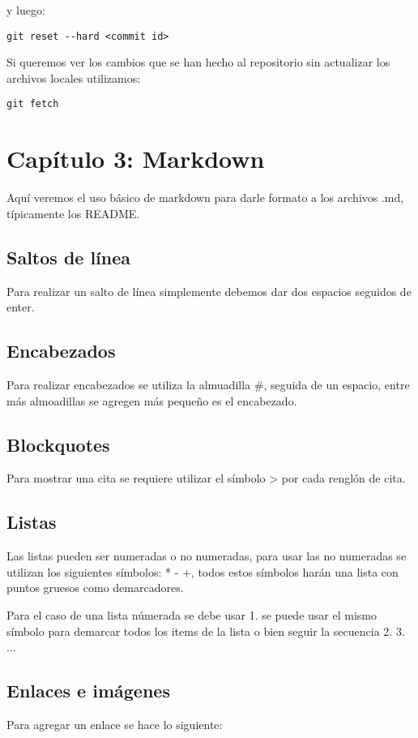 y luego:
\begin{lstlisting}[numbers=none]
  git reset --hard <commit id>
\end{lstlisting}


Si queremos ver los cambios que se han hecho al repositorio sin actualizar los archivos locales utilizamos:
\begin{lstlisting}[numbers=none]
  git fetch
\end{lstlisting}

\section{Cap\'itulo 3: Markdown}
Aqu\'i veremos el uso b\'asico de markdown para darle formato a los archivos .md, t\'ipicamente los README.

\subsection{Saltos de l\'inea}
Para realizar un salto de l\'inea simplemente debemos dar dos espacios seguidos de enter.

\subsection{Encabezados}
Para realizar encabezados se utiliza la almuadilla \#, seguida de un espacio, entre m\'as almoadillas se agregen m\'as pequeño es el encabezado.

\subsection{Blockquotes}
Para mostrar una cita se requiere utilizar el s\'imbolo > por cada rengl\'on de cita.

\subsection{Listas}
Las listas pueden ser numeradas o no numeradas, para usar las no numeradas se utilizan los siguientes s\'imbolos: * - +, todos estos s\'imbolos har\'an una lista con puntos gruesos como demarcadores.

Para el caso de una lista n\'umerada se debe usar 1. se puede usar el mismo s\'imbolo para demarcar todos los items de la lista o bien seguir la secuencia 2. 3. ...

\subsection{Enlaces e im\'agenes}
Para agregar un enlace se hace lo siguiente:


